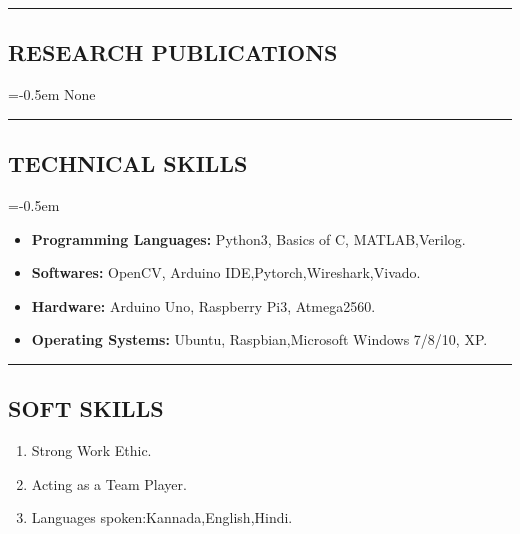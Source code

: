 \documentclass[10pt,letterpaper]{article}
\begin{document}
\hrule
\subsection*{RESEARCH PUBLICATIONS}
\parskip=-0.5em
None

\vspace{1.0em}
\hrule
\subsection*{TECHNICAL SKILLS}
\parskip=-0.5em

\begin{itemize}

    \item \textbf{Programming Languages:} Python3, Basics of C, MATLAB,Verilog.
    \item \textbf{Softwares:} OpenCV, Arduino IDE,Pytorch,Wireshark,Vivado.
    \item \textbf{Hardware:}  Arduino Uno, Raspberry Pi3, Atmega2560.
    \item \textbf{Operating Systems:} Ubuntu, Raspbian,Microsoft Windows 7/8/10, XP.

\end{itemize}

\hrule
\subsection*{SOFT SKILLS}

\begin{enumerate}

	\item Strong Work Ethic.
	\item Acting as a Team Player.
	\item Languages spoken:Kannada,English,Hindi.

\end{enumerate}
\end{document}
